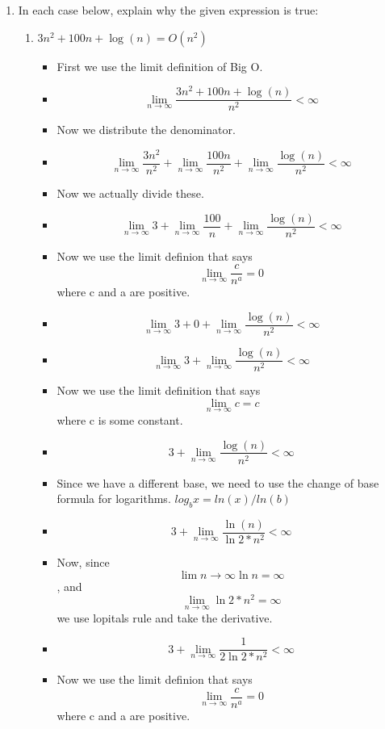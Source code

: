 \documentclass{article}
\begin{document}
\begin{enumerate}
\item In each case below, explain why the given expression is true:
  \begin{enumerate}
  \item $3n^{2} + 100n + \log{(n)} = O(n^{2})$
    \begin{itemize}
    \item [] First we use the limit definition of Big O.
    \item {\Large $$\lim_{n \to \infty} \frac{3n^{2} +100n +\log{(n)}}{n^{2}} < \infty$$}
    \item [] Now we distribute the denominator.
    \item {\Large $$\lim_{n \to \infty} \frac{3n^{2}}{n^{2}} + \lim_{n \to \infty} \frac{100n}{n^{2}} + \lim_{n \to \infty} \frac{\log{(n)}}{n^{2}} < \infty$$}
    \item [] Now we actually divide these.
    \item {\Large $$\lim_{n \to \infty} 3 + \lim_{n \to \infty} \frac{100}{n} + \lim_{n \to \infty} \frac{\log{(n)}}{n^{2}} < \infty$$}
    \item [] Now we use the limit definion that says {\Large $$\lim_{n \to \infty} \frac{c}{n^{a}} =0$$} where c and a are positive.
    \item {\Large $$\lim_{n \to \infty} 3 +0+ \lim_{n \to \infty} \frac{\log{(n)}}{n^{2}} < \infty$$}
    \item {\Large $$\lim_{n \to \infty} 3 + \lim_{n \to \infty} \frac{\log{(n)}}{n^{2}} < \infty$$}
    \item [] Now we use the limit definition that says $$\lim_{n \to \infty} c = c$$ where c is some constant.
    \item {\Large $$3 + \lim_{n \to \infty} \frac{\log{(n)}}{n^{2}} < \infty$$}
    \item [] Since we have a different base, we need to use the change of base formula for logarithms. $log_{b}x =ln(x)/ln(b)$
    \item {\Large $$3 + \lim_{n \to \infty} \frac{\ln{(n)}}{\ln{2}*n^{2}} < \infty$$}
    \item [] Now, since $$\lim{n \to \infty} \ln{n} = \infty$$, and $$\lim_{n \to \infty} \ln{2}*n^{2} = \infty$$ we use lopitals rule and take the derivative. 
    \item {\Large $$3 + \lim_{n \to \infty} \frac{1}{2\ln{2}*n^{2}} < \infty$$}
    \item [] Now we use the limit definion that says {\Large $$\lim_{n \to \infty} \frac{c}{n^{a}} =0$$} where c and a are positive.

\end{itemize}
\end{enumerate}
\end{enumerate}
\end{document}
